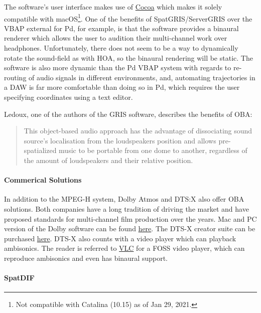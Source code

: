 The software's user interface makes use of \href{https://en.wikipedia.org/wiki/Cocoa_(API)}{Cocoa} which makes it solely compatible with macOS\footnote{Not compatible with Catalina (10.15) as of Jan 29, 2021.}. One of the benefits of SpatGRIS/ServerGRIS over the VBAP external for Pd, for example, is that the software provides a binaural renderer which allows the user to audition their multi-channel work over headphones. Unfortunately, there does not seem to be a way to dynamically rotate the sound-field as with HOA, so the binaural rendering will be static. The software is also more dynamic than the Pd VBAP system with regards to re-routing of audio signals in different environments, and, automating trajectories in a DAW is far more comfortable than doing so in Pd, which requires the user specifying coordinates using a text editor. 

Ledoux, one of the authors of the GRIS software, describes the benefits of OBA:

\begin{quote}
    This object-based audio approach has the advantage of dissociating sound source’s localisation from the loudspeakers position and allows pre-spatialized music to be portable from one dome to another, regardless of the amount of loudspeakers and their relative position. \cite{ledoux2018immersive}
\end{quote}

\paragraph{Commerical Solutions}

In addition to the MPEG-H system, Dolby Atmos and DTS:X also offer OBA solutions. Both companies have a long tradition of driving the market and have proposed standards for multi-channel film production over the years. Mac and PC version of the Dolby software can be found \href{https://developer.dolby.com/tools-media/production-tools/dolby-atmos-mastering-suite-updates/downloads/#!}{here}. The DTS-X creator suite can be purchased \href{https://dts.com/production-tools/#creator-suite}{here}. DTS-X also counts with a video player which can playback ambisonics. The reader is referred to \href{https://www.videolan.org/vlc/releases/3.0.0.html}{VLC} for a FOSS video player, which can reproduce ambisonics and even has binaural support. 

\paragraph{SpatDIF}


